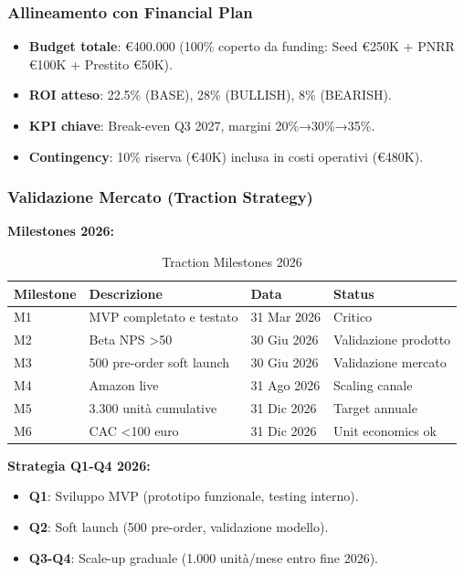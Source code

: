 \documentclass[11pt,a4paper]{report}
\begin{document}
\subsubsection*{Allineamento con Financial Plan}
\begin{itemize}
\item \textbf{Budget totale}: €400.000 (100\% coperto da funding: Seed €250K + PNRR €100K + Prestito €50K).
\item \textbf{ROI atteso}: 22.5\% (BASE), 28\% (BULLISH), 8\% (BEARISH).
\item \textbf{KPI chiave}: Break-even Q3 2027, margini 20\%→30\%→35\%.
\item \textbf{Contingency}: 10\% riserva (€40K) inclusa in costi operativi (€480K).
\end{itemize}

\subsubsection{Validazione Mercato (Traction Strategy)}
\textbf{Milestones 2026:}

\begin{table}[H]
\centering
\caption{Traction Milestones 2026}
\label{tab:traction-milestones}
\begin{tabular}{L{2.5cm} L{4.5cm} C{2cm} L{2cm}}
\toprule
{\bf Milestone} & {\bf Descrizione} & {\bf Data} & {\bf Status} \\
\midrule
M1 & MVP completato e testato & 31 Mar 2026 & Critico \\
M2 & Beta NPS >50 & 30 Giu 2026 & Validazione prodotto \\
M3 & 500 pre-order soft launch & 30 Giu 2026 & Validazione mercato \\
M4 & Amazon live & 31 Ago 2026 & Scaling canale \\
M5 & 3.300 unità cumulative & 31 Dic 2026 & Target annuale \\
M6 & CAC <100 euro & 31 Dic 2026 & Unit economics ok \\
\bottomrule
\end{tabular}
\end{table}

\textbf{Strategia Q1-Q4 2026:}
\begin{itemize}
\item {\bf Q1}: Sviluppo MVP (prototipo funzionale, testing interno).
\item {\bf Q2}: Soft launch (500 pre-order, validazione modello).
\item {\bf Q3-Q4}: Scale-up graduale (1.000 unità/mese entro fine 2026).
\end{itemize}
\end{document}
